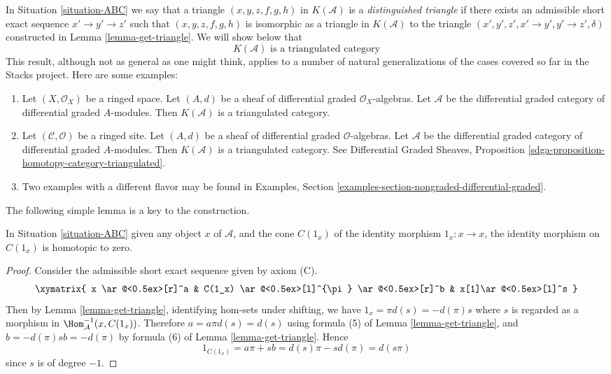 \noindent
In Situation \ref{situation-ABC} we say that a triangle
$(x, y, z, f, g, h)$ in $K(\mathcal{A})$ is a
{\it distinguished triangle} if there exists an admissible
short exact sequence $x' \to y' \to z'$ such that
$(x, y, z, f, g, h)$ is isomorphic as a triangle in $K(\mathcal{A})$
to the triangle $(x', y', z', x' \to y', y' \to z', \delta)$
constructed in Lemma \ref{lemma-get-triangle}. We will show below that
$$
\boxed{
K(\mathcal{A})\text{ is a triangulated category}
}
$$
This result, although not as general as one might think, applies to a
number of natural generalizations of the cases covered so far in the
Stacks project. Here are some examples:
\begin{enumerate}
\item Let $(X, \mathcal{O}_X)$ be a ringed space. Let $(A, d)$ be a
sheaf of differential graded $\mathcal{O}_X$-algebras. Let
$\mathcal{A}$ be the differential graded category of differential
graded $A$-modules. Then $K(\mathcal{A})$ is a triangulated category.
\item Let $(\mathcal{C}, \mathcal{O})$ be a ringed site. Let $(A, d)$ be a
sheaf of differential graded $\mathcal{O}$-algebras. Let
$\mathcal{A}$ be the differential graded category of differential
graded $A$-modules. Then $K(\mathcal{A})$ is a triangulated category.
See Differential Graded Sheaves, Proposition
\ref{sdga-proposition-homotopy-category-triangulated}.
\item Two examples with a different flavor may be found in Examples, Section
\ref{examples-section-nongraded-differential-graded}.
\end{enumerate}

\noindent
The following simple lemma is a key to the construction.

\begin{lemma}
\label{lemma-id-cone-null}
In Situation \ref{situation-ABC}
given any object $x$ of $\mathcal{A}$, and the cone $C(1_x)$ of the
identity morphism $1_x : x \to x$, the identity morphism on
$C(1_x)$ is homotopic to zero.
\end{lemma}

\begin{proof}
Consider the admissible short exact sequence given by axiom (C).
$$
\xymatrix{
x \ar@<0.5ex>[r]^a  &
C(1_x) \ar@<0.5ex>[l]^{\pi} \ar@<0.5ex>[r]^b &
x[1]\ar@<0.5ex>[l]^s
}
$$
Then by Lemma \ref{lemma-get-triangle}, identifying hom-sets under
shifting, we have $1_x=\pi d(s)=-d(\pi)s$ where $s$ is regarded as
a morphism in $\Hom_{\mathcal{A}}^{-1}(x,C(1_x))$. Therefore
$a=a\pi d(s)=d(s)$ using formula (5) of Lemma \ref{lemma-get-triangle},
and $b=-d(\pi)sb=-d(\pi)$ by formula (6) of Lemma \ref{lemma-get-triangle}.
Hence
$$
1_{C(1_x)} = a\pi + sb = d(s)\pi - sd(\pi) = d(s\pi)
$$
since $s$ is of degree $-1$.
\end{proof}

